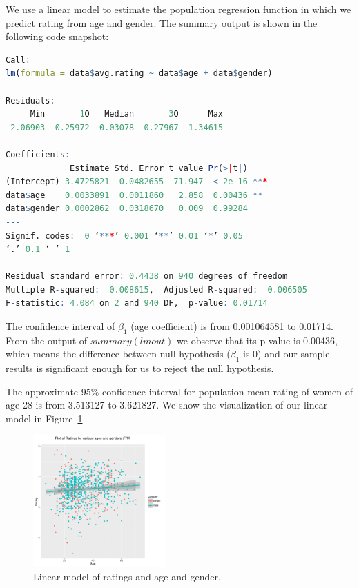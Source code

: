 \documentclass[12pt]{elsarticle}
\begin{document}
We use a linear model to estimate the population regression function in which we predict rating from age and gender. The summary output is shown in the following code snapshot:
\begin{lstlisting}[language=R]
Call:
lm(formula = data$avg.rating ~ data$age + data$gender)

Residuals:
     Min       1Q   Median       3Q      Max 
-2.06903 -0.25972  0.03078  0.27967  1.34615 

Coefficients:
             Estimate Std. Error t value Pr(>|t|)    
(Intercept) 3.4725821  0.0482655  71.947  < 2e-16 ***
data$age    0.0033891  0.0011860   2.858  0.00436 ** 
data$gender 0.0002862  0.0318670   0.009  0.99284    
---
Signif. codes:  0 ‘***’ 0.001 ‘**’ 0.01 ‘*’ 0.05
‘.’ 0.1 ‘ ’ 1

Residual standard error: 0.4438 on 940 degrees of freedom
Multiple R-squared:  0.008615,	Adjusted R-squared:  0.006505 
F-statistic: 4.084 on 2 and 940 DF,  p-value: 0.01714
\end{lstlisting}
The confidence interval of $\beta_1$ (age coefficient) is from 0.001064581 to 0.01714. From the output of $summary(lmout)$ we observe that its p-value is 0.00436, which means the difference between null hypothesis ($\beta_1$ is 0) and our sample results is significant enough for us to reject the null hypothesis.

The approximate 95\% confidence interval for population mean rating of women of age 28 is from 3.513127 to 3.621827. We show the visualization of our linear model in Figure~\ref{fig2}.

\begin{figure}[h!]
\centering\includegraphics[width=0.45\textwidth]{predict.pdf}
\caption{Linear model of ratings and age and gender.}
\label{fig2}
\end{figure}
\end{document}
